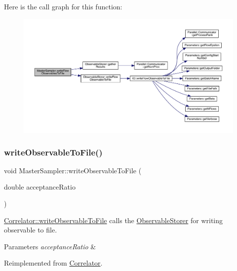 Here is the call graph for this function\+:
\nopagebreak
\begin{figure}[H]
\begin{center}
\leavevmode
\includegraphics[width=350pt]{class_master_sampler_ad475928217ac61fae134128904aaa9f8_cgraph}
\end{center}
\end{figure}
\mbox{\label{class_master_sampler_a638714c38e1a6252ab8b6be1fa224bd4}} 
\subsubsection{\texorpdfstring{writeObservableToFile()}{writeObservableToFile()}}
{\footnotesize\ttfamily void Master\+Sampler\+::write\+Observable\+To\+File (\begin{DoxyParamCaption}\item[{double}]{acceptance\+Ratio }\end{DoxyParamCaption})\hspace{0.3cm}{\ttfamily [virtual]}}



\mbox{\hyperlink{class_correlator_a9e8d80e30e4fbe3b7fe57521538cb5ff}{Correlator\+::write\+Observable\+To\+File}} calls the \mbox{\hyperlink{class_observable_storer}{Observable\+Storer}} for writing observable to file. 


\begin{DoxyParams}{Parameters}
{\em acceptance\+Ratio} & \\
\hline
\end{DoxyParams}


Reimplemented from \mbox{\hyperlink{class_correlator_a9e8d80e30e4fbe3b7fe57521538cb5ff}{Correlator}}.

